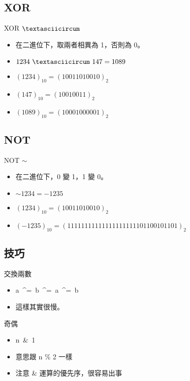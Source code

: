 \documentclass[t]{beamer}
\begin{document}
\subsection{XOR}
\begin{frame}{XOR $\textasciicircum$}
  \begin{itemize}
    \item 在二進位下，取兩者相異為 1，否則為 0。
    \item $1234\ \textasciicircum\ 147 = 1089$
    \item $(1234)_{10} = (10011010010)_{2}$
    \item $(147)_{10} = (10010011)_{2}$
    \item $(1089)_{10} = (10001000001)_{2}$
  \end{itemize}
\end{frame}

\subsection{NOT}
\begin{frame}{NOT $\sim$}
  \begin{itemize}
    \item 在二進位下，0 變 1，1 變 0。
    \item $\sim 1234 = -1235$
    \item $(1234)_{10} = (10011010010)_{2}$
    \item $(-1235)_{10} = (11111111111111111111101100101101)_{2}$
  \end{itemize}
\end{frame}

\subsection{技巧}
\begin{frame}{交換兩數}
  \begin{itemize}
    \item a\ \textasciicircum=\ b\ \textasciicircum=\ a\ \textasciicircum=\ b
    \item 這樣其實很慢。
  \end{itemize}
\end{frame}

\begin{frame}{奇偶}
  \begin{itemize}
    \item n\ \&\ 1
    \item 意思跟 n \% 2 一樣
    \item 注意 \& 運算的優先序，很容易出事
  \end{itemize}
\end{frame}
\end{document}
